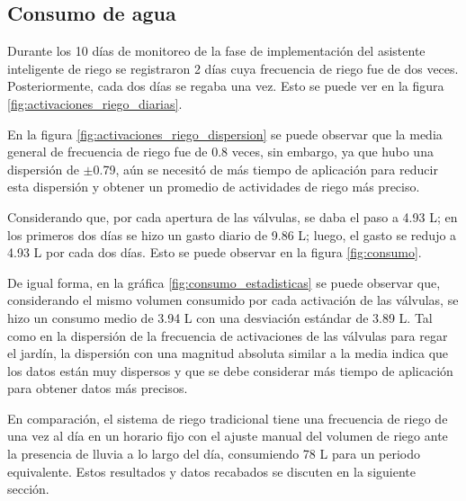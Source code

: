 \documentclass[pdflatex,sn-mathphys-num]{sn-jnl}%
\theoremstyle{thmstyleone}%
\theoremstyle{thmstyletwo}%
\theoremstyle{thmstylethree}%
\begin{document}
\begin{multicols}{2}
\justifying

\subsection*{Consumo de agua}
Durante los 10 días de monitoreo de la fase de implementación del asistente inteligente de riego se registraron 2 días cuya frecuencia de riego fue de dos veces. Posteriormente, cada dos días se regaba una vez. Esto se puede ver en la figura \ref{fig:activaciones_riego_diarias}.

En la figura \ref{fig:activaciones_riego_dispersion} se puede observar que la media general de frecuencia de riego fue de 0.8 veces, sin embargo, ya que hubo una dispersión de $\pm$0.79, aún se necesitó de más tiempo de aplicación para reducir esta dispersión y obtener un promedio de actividades de riego más preciso.

Considerando que, por cada apertura de las válvulas, se daba el paso a 4.93 L; en los primeros dos días se hizo un gasto diario de 9.86 L; luego, el gasto se redujo a 4.93 L por cada dos días. Esto se puede observar en la figura \ref{fig:consumo}.

De igual forma, en la gráfica \ref{fig:consumo_estadisticas} se puede observar que, considerando el mismo volumen consumido por cada activación de las válvulas, se hizo un consumo medio de 3.94 L con una desviación estándar de 3.89 L. Tal como en la dispersión de la frecuencia de activaciones de las válvulas para regar el jardín, la dispersión con una magnitud absoluta similar a la media indica que los datos están muy dispersos y que se debe considerar más tiempo de aplicación para obtener datos más precisos. 

En comparación, el sistema de riego tradicional tiene una frecuencia de riego de una vez al día en un horario fijo con el ajuste manual del volumen de riego ante la presencia de lluvia a lo largo del día, consumiendo 78 L para un periodo equivalente. Estos resultados y datos recabados se discuten en la siguiente sección.

\end{multicols}
\end{document}
